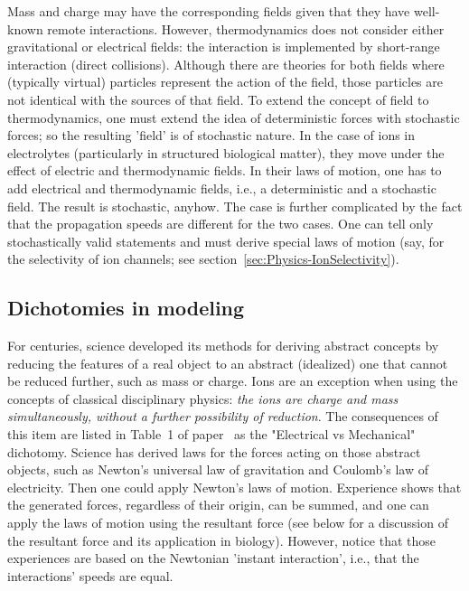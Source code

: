 Mass and charge may have the corresponding fields 
given that they have well-known remote interactions. 
However, thermodynamics does not consider either
gravitational or electrical fields: the interaction 
is implemented by short-range interaction (direct collisions). Although there are
theories for both fields where (typically virtual) particles
represent the action of the field, those particles
are not identical with the sources of that field.
To extend the concept of field to thermodynamics,
one must extend the idea of deterministic forces
with stochastic forces; so the resulting 'field'
is of stochastic nature.
In the case of ions in electrolytes (particularly in
structured biological matter), they move under the effect of
electric and thermodynamic fields.
In their laws of motion, one has to add electrical and thermodynamic fields, i.e., a deterministic and a stochastic field. The result is stochastic, anyhow.
The case is further complicated by the fact that 
the propagation speeds are different for the two cases.
One can tell only stochastically valid statements
and must derive special laws of motion
(say, for the selectivity of ion channels; see section~\ref{sec:Physics-IonSelectivity}).


\subsection[Dichotomies]{Dichotomies in modeling\label{sec:Physics-Dichotomies}}

For centuries, science developed its methods for deriving abstract concepts
by reducing the features of a real object to an abstract (idealized) one that cannot be reduced further, such as mass or charge.
Ions are an exception when using the concepts of classical disciplinary physics: \textit{the ions are charge and mass simultaneously, without a further possibility of reduction}.
The consequences of this item are listed in Table~1 of paper~\cite{ThermodynamicAPDrukarch:2022}
as the "Electrical vs Mechanical" \hypertarget{dichotomy}{dichotomy}.
Science has derived laws for the forces acting on those abstract objects, such as Newton's universal law of gravitation and Coulomb's law of electricity. Then one could apply Newton's laws of motion. Experience shows that the generated forces, regardless of their origin, can be summed, and one can apply the laws of motion using the resultant force (see below for a discussion of the resultant force and its application in biology). However, notice that those experiences are based on the Newtonian
'instant interaction', i.e., that the interactions' speeds are equal.




